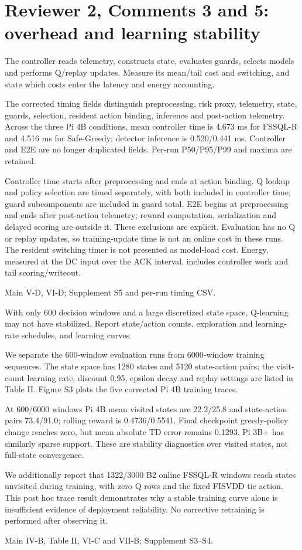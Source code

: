 \documentclass[10pt,a4paper]{article}
\newcommand{\commentbox}[1]{\begin{rcommentbox}#1\end{rcommentbox}}
\newcommand{\responsebox}[1]{\begin{authorresponsebox}#1\end{authorresponsebox}}
\newcommand{\changebox}[1]{\begin{wherebox}#1\end{wherebox}}
\begin{document}
\clearpage
\section*{Reviewer 2, Comments 3 and 5: overhead and learning stability}
\commentbox{The controller reads telemetry, constructs state, evaluates guards, selects models and performs Q/replay updates. Measure its mean/tail cost and switching, and state which costs enter the latency and energy accounting.}
\responsebox{The corrected timing fields distinguish preprocessing, risk proxy, telemetry, state, guards, selection, resident action binding, inference and post-action telemetry. Across the three Pi 4B conditions, mean controller time is 4.673 ms for FSSQL-R and 4.516 ms for Safe-Greedy; detector inference is 0.520/0.441 ms. Controller and E2E are no longer duplicated fields. Per-run P50/P95/P99 and maxima are retained.

Controller time starts after preprocessing and ends at action binding. Q lookup and policy selection are timed separately, with both included in controller time; guard subcomponents are included in guard total. E2E begins at preprocessing and ends after post-action telemetry; reward computation, serialization and delayed scoring are outside it. These exclusions are explicit. Evaluation has no Q or replay updates, so training-update time is not an online cost in these runs. The resident switching timer is not presented as model-load cost. Energy, measured at the DC input over the ACK interval, includes controller work and tail scoring/writeout.}
\changebox{Main V-D, VI-D; Supplement S5 and per-run timing CSV.}
\commentbox{With only 600 decision windows and a large discretized state space, Q-learning may not have stabilized. Report state/action counts, exploration and learning-rate schedules, and learning curves.}
\responsebox{We separate the 600-window evaluation runs from 6000-window training sequences. The state space has 1280 states and 5120 state-action pairs; the visit-count learning rate, discount 0.95, epsilon decay and replay settings are listed in Table II. Figure S3 plots the five corrected Pi 4B training traces.

At 600/6000 windows Pi 4B mean visited states are 22.2/25.8 and state-action pairs 73.4/91.0; rolling reward is 0.4736/0.5541. Final checkpoint greedy-policy change reaches zero, but mean absolute TD error remains 0.1293. Pi 3B+ has similarly sparse support. These are stability diagnostics over visited states, not full-state convergence.

We additionally report that 1322/3000 B2 online FSSQL-R windows reach states unvisited during training, with zero Q rows and the fixed FISVDD tie action. This post hoc trace result demonstrates why a stable training curve alone is insufficient evidence of deployment reliability. No corrective retraining is performed after observing it.}
\changebox{Main IV-B, Table II, VI-C and VII-B; Supplement S3--S4.}
\end{document}
